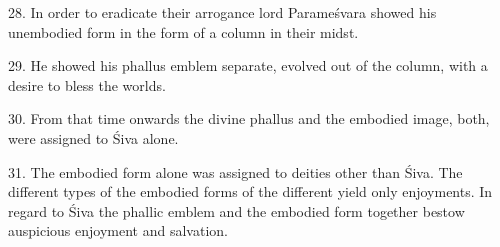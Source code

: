 28. In order to eradicate their arrogance lord Parameśvara showed his unembodied
 form in the form of a column in their midst.

29. He showed his phallus emblem separate, evolved out of the column, with a
desire to bless the worlds.

30. From that time onwards the divine phallus and the embodied image, both, were
assigned to Śiva alone.

31. The embodied form alone was assigned to deities other than Śiva.
The different types of the embodied forms of the different  yield only
enjoyments. In regard to Śiva the phallic emblem and the embodied form together
bestow auspicious enjoyment and salvation.
